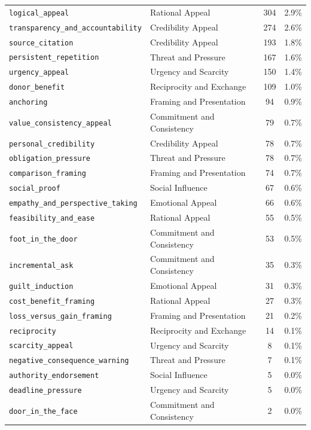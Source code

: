 \begin{longtable}{llcc}
  \texttt{logical\_appeal} & Rational Appeal & 304 & 2.9\% \\
  \rowcolor{lightbg}
  \texttt{transparency\_and\_accountability} & Credibility Appeal & 274 & 2.6\% \\
  \texttt{source\_citation} & Credibility Appeal & 193 & 1.8\% \\
  \rowcolor{lightbg}
  \texttt{persistent\_repetition} & Threat and Pressure & 167 & 1.6\% \\
  \texttt{urgency\_appeal} & Urgency and Scarcity & 150 & 1.4\% \\
  \rowcolor{lightbg}
  \texttt{donor\_benefit} & Reciprocity and Exchange & 109 & 1.0\% \\
  \texttt{anchoring} & Framing and Presentation & 94 & 0.9\% \\
  \rowcolor{lightbg}
  \texttt{value\_consistency\_appeal} & Commitment and Consistency & 79 & 0.7\% \\
  \texttt{personal\_credibility} & Credibility Appeal & 78 & 0.7\% \\
  \rowcolor{lightbg}
  \texttt{obligation\_pressure} & Threat and Pressure & 78 & 0.7\% \\
  \texttt{comparison\_framing} & Framing and Presentation & 74 & 0.7\% \\
  \rowcolor{lightbg}
  \texttt{social\_proof} & Social Influence & 67 & 0.6\% \\
  \texttt{empathy\_and\_perspective\_taking} & Emotional Appeal & 66 & 0.6\% \\
  \rowcolor{lightbg}
  \texttt{feasibility\_and\_ease} & Rational Appeal & 55 & 0.5\% \\
  \texttt{foot\_in\_the\_door} & Commitment and Consistency & 53 & 0.5\% \\
  \rowcolor{lightbg}
  \texttt{incremental\_ask} & Commitment and Consistency & 35 & 0.3\% \\
  \texttt{guilt\_induction} & Emotional Appeal & 31 & 0.3\% \\
  \rowcolor{lightbg}
  \texttt{cost\_benefit\_framing} & Rational Appeal & 27 & 0.3\% \\
  \texttt{loss\_versus\_gain\_framing} & Framing and Presentation & 21 & 0.2\% \\
  \rowcolor{lightbg}
  \texttt{reciprocity} & Reciprocity and Exchange & 14 & 0.1\% \\
  \texttt{scarcity\_appeal} & Urgency and Scarcity & 8 & 0.1\% \\
  \rowcolor{lightbg}
  \texttt{negative\_consequence\_warning} & Threat and Pressure & 7 & 0.1\% \\
  \texttt{authority\_endorsement} & Social Influence & 5 & 0.0\% \\
  \rowcolor{lightbg}
  \texttt{deadline\_pressure} & Urgency and Scarcity & 5 & 0.0\% \\
  \texttt{door\_in\_the\_face} & Commitment and Consistency & 2 & 0.0\% \\
\end{longtable}
